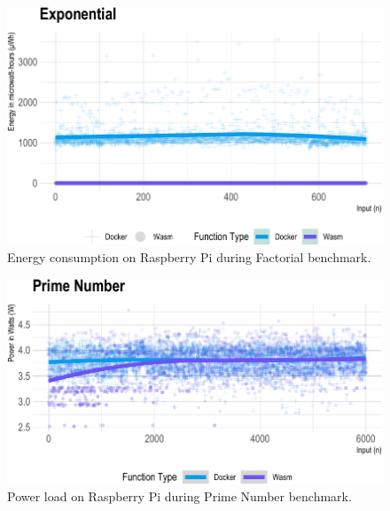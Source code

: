 \documentclass[
  table]{report}
\begin{document}
\begin{figure}[H]

{\centering \includegraphics{thesis_files/figure-latex/exp-energy-1} 

}

\caption{Energy consumption on Raspberry Pi during Factorial benchmark.}\label{fig:exp-energy}
\end{figure}

\newpage

\begin{figure}[H]

{\centering \includegraphics{thesis_files/figure-latex/prime-power-1} 

}

\caption{Power load on Raspberry Pi during Prime Number benchmark.}\label{fig:prime-power}
\end{figure}
\end{document}

